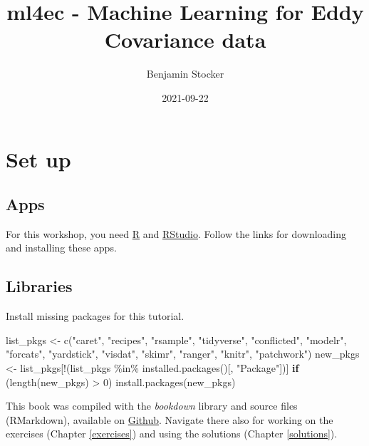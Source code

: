 \documentclass[
]{book}
\title{ml4ec - Machine Learning for Eddy Covariance data}
\author{Benjamin Stocker}
\date{2021-09-22}
\newenvironment{Shaded}{\begin{snugshade}}{\end{snugshade}}
\newcommand{\ControlFlowTok}[1]{\textcolor[rgb]{0.13,0.29,0.53}{\textbf{#1}}}
\newcommand{\DecValTok}[1]{\textcolor[rgb]{0.00,0.00,0.81}{#1}}
\newcommand{\FunctionTok}[1]{\textcolor[rgb]{0.00,0.00,0.00}{#1}}
\newcommand{\NormalTok}[1]{#1}
\newcommand{\OtherTok}[1]{\textcolor[rgb]{0.56,0.35,0.01}{#1}}
\newcommand{\SpecialCharTok}[1]{\textcolor[rgb]{0.00,0.00,0.00}{#1}}
\newcommand{\StringTok}[1]{\textcolor[rgb]{0.31,0.60,0.02}{#1}}
\begin{document}
\maketitle

{
\setcounter{tocdepth}{1}
\tableofcontents
}
\hypertarget{set-up}{%
\chapter{Set up}\label{set-up}}

\hypertarget{apps}{%
\section{Apps}\label{apps}}

For this workshop, you need \href{https://www.r-project.org/}{R} and \href{https://www.rstudio.com/products/rstudio/download/}{RStudio}. Follow the links for downloading and installing these apps.

\hypertarget{libraries}{%
\section{Libraries}\label{libraries}}

Install missing packages for this tutorial.

\begin{Shaded}
\begin{Highlighting}[]
\NormalTok{list\_pkgs }\OtherTok{\textless{}{-}} \FunctionTok{c}\NormalTok{(}\StringTok{"caret"}\NormalTok{, }\StringTok{"recipes"}\NormalTok{, }\StringTok{"rsample"}\NormalTok{, }\StringTok{"tidyverse"}\NormalTok{, }\StringTok{"conflicted"}\NormalTok{, }\StringTok{"modelr"}\NormalTok{, }\StringTok{"forcats"}\NormalTok{, }\StringTok{"yardstick"}\NormalTok{, }\StringTok{"visdat"}\NormalTok{, }\StringTok{"skimr"}\NormalTok{, }\StringTok{"ranger"}\NormalTok{, }\StringTok{"knitr"}\NormalTok{, }\StringTok{"patchwork"}\NormalTok{)}
\NormalTok{new\_pkgs }\OtherTok{\textless{}{-}}\NormalTok{ list\_pkgs[}\SpecialCharTok{!}\NormalTok{(list\_pkgs }\SpecialCharTok{\%in\%} \FunctionTok{installed.packages}\NormalTok{()[, }\StringTok{"Package"}\NormalTok{])]}
\ControlFlowTok{if}\NormalTok{ (}\FunctionTok{length}\NormalTok{(new\_pkgs) }\SpecialCharTok{\textgreater{}} \DecValTok{0}\NormalTok{) }\FunctionTok{install.packages}\NormalTok{(new\_pkgs)}
\end{Highlighting}
\end{Shaded}

This book was compiled with the \emph{bookdown} library and source files (RMarkdown), available on \href{https://github.com/stineb/ml4ec_workshop}{Github}. Navigate there also for working on the exercises (Chapter \ref{exercises}) and using the solutions (Chapter \ref{solutions}).
\end{document}
